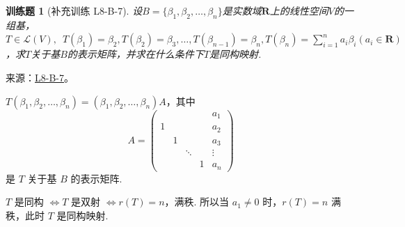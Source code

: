 \documentclass[12pt,fontset=fandol]{ctexart}
\newtheorem{exercise}{训练题}[section]
\begin{document}
\begin{exercise}[补充训练 L8-B-7]\label{prob:L8-B-7}
设$B=\{\beta_1,\beta_2,\ldots,\beta_n\}$是实数域$\mathbf{R}$上的线性空间$V$的一组基，$T \in \mathcal{L}(V),\enspace T(\beta_1)=\beta_2,T(\beta_2)=\beta_3,\ldots,T(\beta_{n-1}) = \beta_n,T(\beta_n)=\displaystyle\sum_{i=1}^{n}a_i\beta_i(a_i \in \mathbf{R})$，求$T$关于基$B$的表示矩阵，并求在什么条件下$T$是同构映射.
\end{exercise}
\noindent 来源：\href{https://github.com/yhwu-is/Linear-Algebra-Left-Undone/blob/new/%E8%AE%B2%E4%B9%89/%E4%B8%93%E9%A2%98/8%20%E7%9B%B8%E6%8A%B5%E6%A0%87%E5%87%86%E5%BD%A2.tex}{L8-B-7}。
\begin{solve}
$ T(\beta_1, \beta_2, \ldots, \beta_n) = (\beta_1, \beta_2, \ldots, \beta_n)A $，其中
            \[ A = \begin{pmatrix}
                      &   &        &   & a_1    \\
                    1 &   &        &   & a_2    \\
                      & 1 &        &   & a_3    \\
                      &   & \ddots &   & \vdots \\
                      &   &        & 1 & a_n
                \end{pmatrix} \]
            是 $ T $ 关于基 $ B $ 的表示矩阵.

            $ T $ 是同构 $ \iff T $ 是双射 $ \iff r(T) = n $，满秩. 所以当 $ a_1 \neq 0 $ 时，$ r(T) = n $ 满秩，此时 $ T $ 是同构映射.
\end{solve}
\end{document}
